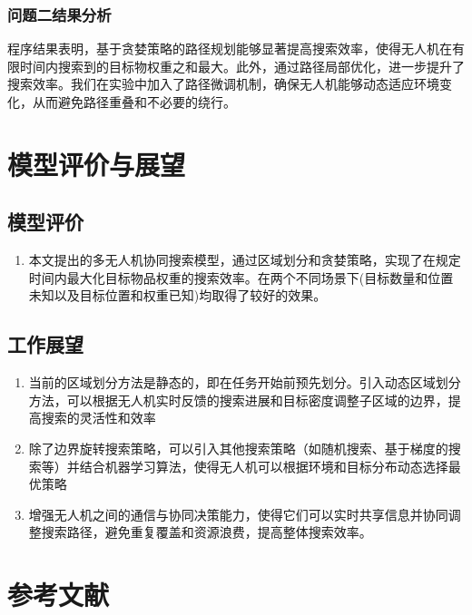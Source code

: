 \documentclass[bwprint]{gmcmthesis}
\numberwithin{figure}{section}
\begin{document}
\begin{enumerate}
\subsubsection{问题二结果分析}
	程序结果表明，基于贪婪策略的路径规划能够显著提高搜索效率，使得无人机在有限时间内搜索到的目标物权重之和最大。此外，通过路径局部优化，进一步提升了搜索效率。我们在实验中加入了路径微调机制，确保无人机能够动态适应环境变化，从而避免路径重叠和不必要的绕行。

\end{enumerate}

\vspace*{1cm}
\section{模型评价与展望}
\subsection{模型评价}
\begin{enumerate}
	\item 本文提出的多无人机协同搜索模型，通过区域划分和贪婪策略，实现了在规定时间内最大化目标物品权重的搜索效率。在两个不同场景下(目标数量和位置未知以及目标位置和权重已知)均取得了较好的效果。
\end{enumerate}
	

\subsection{工作展望}
\begin{enumerate}
	\item 当前的区域划分方法是静态的，即在任务开始前预先划分。引入动态区域划分方法，可以根据无人机实时反馈的搜索进展和目标密度调整子区域的边界，提高搜索的灵活性和效率
	\item 除了边界旋转搜索策略，可以引入其他搜索策略（如随机搜索、基于梯度的搜索等）并结合机器学习算法，使得无人机可以根据环境和目标分布动态选择最优策略
	\item 增强无人机之间的通信与协同决策能力，使得它们可以实时共享信息并协同调整搜索路径，避免重复覆盖和资源浪费，提高整体搜索效率。
\end{enumerate}


\newpage
\section{参考文献}



\newpage
\appendix
\end{document}
